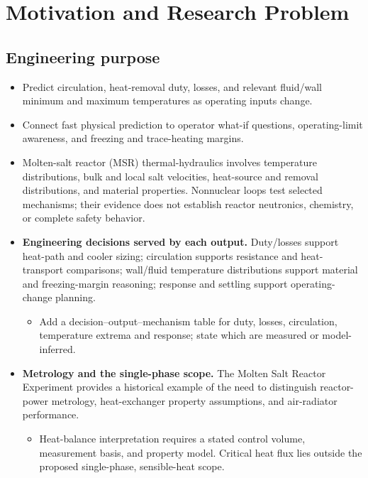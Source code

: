 \section{Motivation and Research Problem}\label{sec:motivation-and-research-problem}

\subsection{Engineering purpose}\label{subsec:engineering-purpose}

\begin{itemize}[leftmargin=*]
\item Predict circulation, heat-removal duty, losses, and relevant fluid/\allowbreak{}wall minimum and maximum temperatures as operating inputs change.
\item Connect fast physical prediction to operator what-if questions, operating-limit awareness, and freezing and trace-heating margins.
\item Molten-salt reactor (MSR) thermal-hydraulics involves temperature distributions, bulk and local salt velocities, heat-source and removal distributions, and material properties. Nonnuclear loops test selected mechanisms; their evidence does not establish reactor neutronics, chemistry, or complete safety behavior.\cite{brown2020msrphenomena}

\item {}\textbf{Engineering decisions served by each output.} Duty/\allowbreak{}losses support heat-path and cooler sizing; circulation supports resistance and heat-transport comparisons; wall/\allowbreak{}fluid temperature distributions support material and freezing-margin reasoning; response and settling support operating-change planning.\cite{brown2020msrphenomena}
\begin{itemize}
\item Add a decision--output--mechanism table for duty, losses, circulation, temperature extrema and response; state which are measured or model-inferred.
\end{itemize}
\item {}\textbf{Metrology and the single-phase scope.} The Molten Salt Reactor Experiment provides a historical example of the need to distinguish reactor-power metrology, heat-exchanger property assumptions, and air-radiator performance.\cite{gabbard1970msre}
\begin{itemize}
\item Heat-balance interpretation requires a stated control volume, measurement basis, and property model. Critical heat flux lies outside the proposed single-phase, sensible-heat scope.
\end{itemize}
\end{itemize}

